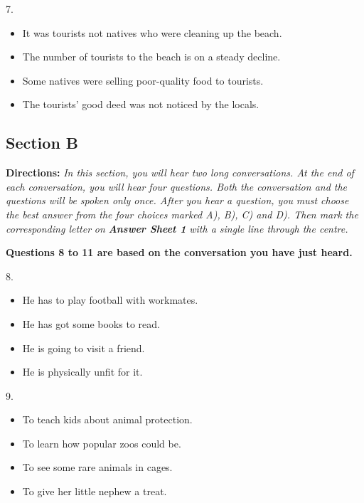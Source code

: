 \documentclass[UTF8,11pt]{ctexart}
\begin{document}
7.


\begin{itemize}[leftmargin=2em,itemsep=.2em,topsep=.4em]\item[A.] It was tourists not natives who were cleaning up the beach.
\item[B.] The number of tourists to the beach is on a steady decline.
\item[C.] Some natives were selling poor-quality food to tourists.
\item[D.] The tourists’ good deed was not noticed by the locals.
\end{itemize}

\subsection*{\textbf{Section B}}


\textbf{Directions:} \textit{In this section, you will hear two long conversations. At the end of each conversation, you will hear} \textit{four questions. Both the conversation and the questions will be spoken only once. After you hear a question, you} \textit{must choose the best answer from the four choices marked A), B), C) and D). Then mark the corresponding letter} \textit{on }\textbf{\textit{Answer Sheet 1}}\textit{ with a single line through the centre.}


\textbf{Questions 8 to 11 are based on the conversation you have just heard.}


8.


\begin{itemize}[leftmargin=2em,itemsep=.2em,topsep=.4em]\item[A.] He has to play football with workmates.
\item[B.] He has got some books to read.
\item[C.] He is going to visit a friend.
\item[D.] He is physically unfit for it.
\end{itemize}

9.


\begin{itemize}[leftmargin=2em,itemsep=.2em,topsep=.4em]\item[A.] To teach kids about animal protection.
\item[B.] To learn how popular zoos could be.
\item[C.] To see some rare animals in cages.
\item[D.] To give her little nephew a treat.
\end{itemize}
\end{document}
